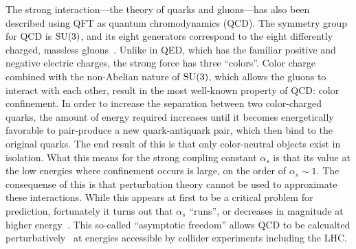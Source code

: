 The strong interaction---the theory of quarks and gluons---has also been described using QFT as quantum chromodynamics (QCD).
The symmetry group for QCD is $\textrm{SU}(3)$, and its eight generators correspond to the eight differently charged, massless gluons~\cite{1965.Han-Nambu.Propose-color}.
Unlike in QED, which has the familiar positive and negative electric charges, the strong force has three ``colors''.
Color charge combined with the non-Abelian nature of $\textrm{SU}(3)$, which allows the gluons to interact with each other, result in the most well-known property of QCD: color confinement.
In order to increase the separation between two color-charged quarks, the amount of energy required increases until it becomes energetically favorable to pair-produce a new quark-antiquark pair, which then bind to the original quarks.
The end result of this is that only color-neutral objects exist in isolation. %
What this means for the strong coupling constant $\alpha_s$ is that its value at the low energies where confinement occurs is large, on the order of $\alpha_s\sim 1$.
The consequense of this is that perturbation theory cannot be used to approximate these interactions.
While this appears at first to be a critical problem for prediction, fortunately it turns out that $\alpha_s$ ``runs'', or decreases in magnitude at higher energy~\cite{1973.asymptotically-free-i, 1974.asymptotically-free-ii}.
This so-called ``asymptotic freedom'' allows QCD to be calcualted perturbatively~\cite{1973.strong-perturbation} at energies accessible by collider experiments including the LHC.

